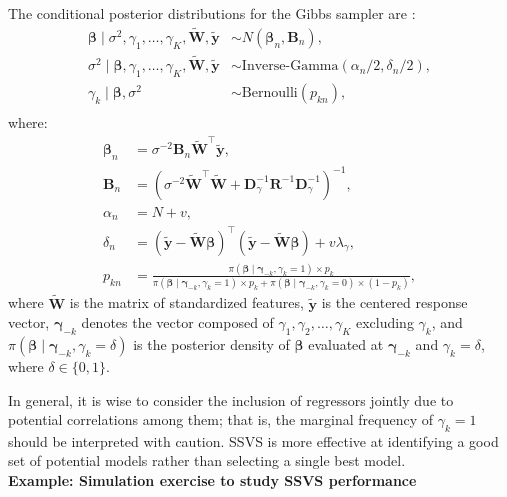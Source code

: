 The conditional posterior distributions for the Gibbs sampler are \cite{george1993variable}:
\begin{align*}
	\boldsymbol{\beta} \mid \sigma^2, \gamma_1, \dots, \gamma_K, \tilde{\mathbf{W}}, \tilde{\mathbf{y}} &\sim {N}(\boldsymbol{\beta}_n, \mathbf{B}_n), \\
	\sigma^2 \mid \boldsymbol{\beta}, \gamma_1, \dots, \gamma_K, \tilde{\mathbf{W}}, \tilde{\mathbf{y}} &\sim \text{Inverse-Gamma}(\alpha_n/2, \delta_n/2), \\
	\gamma_k \mid \boldsymbol{\beta}, \sigma^2 &\sim \text{Bernoulli}(p_{kn}),\\
\end{align*}
where:
\begin{align*}
	\boldsymbol{\beta}_n &= \sigma^{-2} \mathbf{B}_n \tilde{\mathbf{W}}^{\top} \tilde{\mathbf{y}}, \\
	\mathbf{B}_n &= \left(\sigma^{-2} \tilde{\mathbf{W}}^{\top} \tilde{\mathbf{W}} + \mathbf{D}_{\gamma}^{-1}\mathbf{R}^{-1}\mathbf{D}_{\gamma}^{-1} \right)^{-1}, \\
	\alpha_n &= N + v, \\
	\delta_n &= (\tilde{\mathbf{y}} - \tilde{\mathbf{W}} \boldsymbol{\beta})^{\top} (\tilde{\mathbf{y}} - \tilde{\mathbf{W}} \boldsymbol{\beta}) + v\lambda_{\gamma}, \\
	p_{kn} &= \frac{\pi(\boldsymbol{\beta}\mid \boldsymbol{\gamma}_{-k},\gamma_k=1)\times p_k}{\pi(\boldsymbol{\beta}\mid \boldsymbol{\gamma}_{-k},\gamma_k=1)\times p_k+\pi(\boldsymbol{\beta}\mid \boldsymbol{\gamma}_{-k},\gamma_k=0)\times (1-p_k)},
\end{align*}
where \(\tilde{\mathbf{W}}\) is the matrix of standardized features, \(\tilde{\mathbf{y}}\) is the centered response vector, \(\boldsymbol{\gamma}_{-k}\) denotes the vector composed of \(\gamma_1, \gamma_2, \dots, \gamma_K\) excluding \(\gamma_k\), and \(\pi(\boldsymbol{\beta} \mid \boldsymbol{\gamma}_{-k}, \gamma_k = \delta)\) is the posterior density of \(\boldsymbol{\beta}\) evaluated at \(\boldsymbol{\gamma}_{-k}\) and \(\gamma_k = \delta\), where \(\delta \in \{0,1\}\).

In general, it is wise to consider the inclusion of regressors jointly due to potential correlations among them; that is, the marginal frequency of \(\gamma_k = 1\) should be interpreted with caution. SSVS is more effective at identifying a good set of potential models rather than selecting a single best model.\\

\textbf{Example: Simulation exercise to study SSVS performance}

